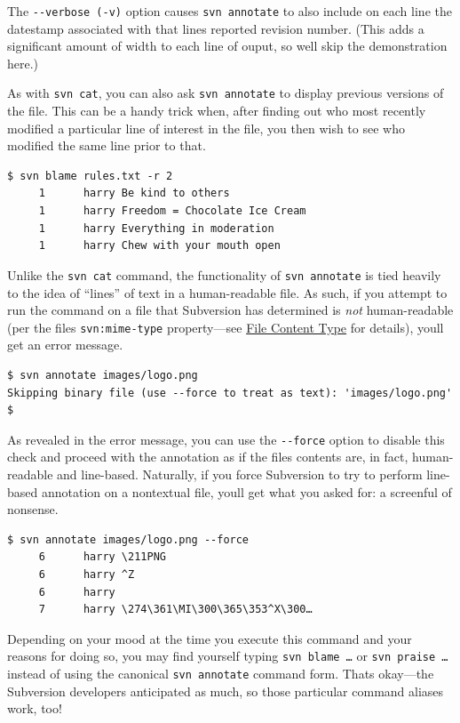The \texttt{-\/-verbose\ (-v)} option causes \texttt{svn\ annotate} to
also include on each line the datestamp associated with that
line\textquotesingle s reported revision number. (This adds a
significant amount of width to each line of ouput, so
we\textquotesingle ll skip the demonstration here.)

As with \texttt{svn\ cat}, you can also ask \texttt{svn\ annotate} to
display previous versions of the file. This can be a handy trick when,
after finding out who most recently modified a particular line of
interest in the file, you then wish to see who modified the same line
prior to that.

\begin{verbatim}
$ svn blame rules.txt -r 2
     1      harry Be kind to others
     1      harry Freedom = Chocolate Ice Cream
     1      harry Everything in moderation
     1      harry Chew with your mouth open
\end{verbatim}

Unlike the \texttt{svn\ cat} command, the functionality of
\texttt{svn\ annotate} is tied heavily to the idea of ``lines'' of text
in a human-readable file. As such, if you attempt to run the command on
a file that Subversion has determined is \emph{not} human-readable (per
the file\textquotesingle s \texttt{svn:mime-type} property---see
\hyperref[svn.advanced.props.special.mime-type]{File Content Type} for
details), you\textquotesingle ll get an error message.

\begin{verbatim}
$ svn annotate images/logo.png
Skipping binary file (use --force to treat as text): 'images/logo.png'
$
\end{verbatim}

As revealed in the error message, you can use the \texttt{-\/-force}
option to disable this check and proceed with the annotation as if the
file\textquotesingle s contents are, in fact, human-readable and
line-based. Naturally, if you force Subversion to try to perform
line-based annotation on a nontextual file, you\textquotesingle ll get
what you asked for: a screenful of nonsense.

\begin{verbatim}
$ svn annotate images/logo.png --force
     6      harry \211PNG
     6      harry ^Z
     6      harry 
     7      harry \274\361\MI\300\365\353^X\300…
\end{verbatim}

Depending on your mood at the time you execute this command and your
reasons for doing so, you may find yourself typing
\texttt{svn\ blame\ …} or \texttt{svn\ praise\ …} instead of using the
canonical \texttt{svn\ annotate} command form. That\textquotesingle s
okay---the Subversion developers anticipated as much, so those
particular command aliases work, too!

